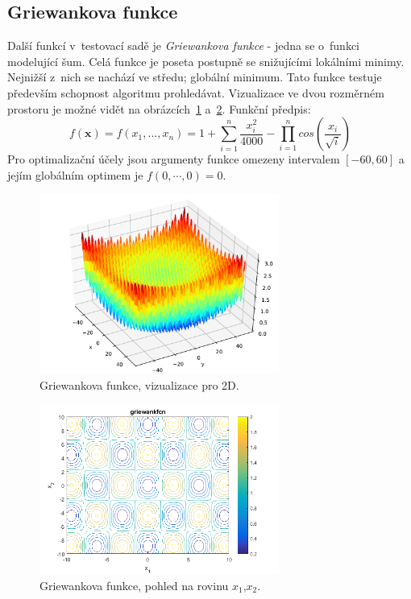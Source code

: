 \subsection{Griewankova funkce}
Další funkcí v~testovací sadě je \textit{Griewankova funkce} - jedna se o~funkci modelující šum. Celá funkce je poseta postupně se snižujícími lokálními minimy. Nejnižší z~nich se nachází ve středu; globální minimum. Tato funkce testuje především schopnost algoritmu prohledávat. Vizualizace ve dvou rozměrném prostoru je možné vidět na obrázcích~\ref{fg:griewank} a~\ref{fg:griewankContour}. Funkční předpis:
\begin{equation}
f(\textbf{x}) = f(x_1, ..., x_n) = 1 + \sum_{i=1}^{n} \frac{x_i^{2}}{4000} - \prod_{i=1}^{n}cos(\frac{x_i}{\sqrt{i}})
\label{eq:griew}
\end{equation}
Pro optimalizační účely jsou argumenty funkce omezeny intervalem $[-60, 60]$ a jejím globálním optimem je $f(0, \cdots, 0) = 0$.

\begin{figure}[H]
	\centering
	\includegraphics[width=0.7\textwidth]{obrazky-figures/griewank.pdf}
	\caption{Griewankova funkce, vizualizace pro 2D.}
	\label{fg:griewank}
\end{figure}

\begin{figure}[H]
	\centering
	\includegraphics[width=0.7\textwidth]{obrazky-figures/griewankfcn_10_contour.png}
	\caption{Griewankova funkce, pohled na rovinu $x_1$,$x_2$.}
	\label{fg:griewankContour}
\end{figure}

